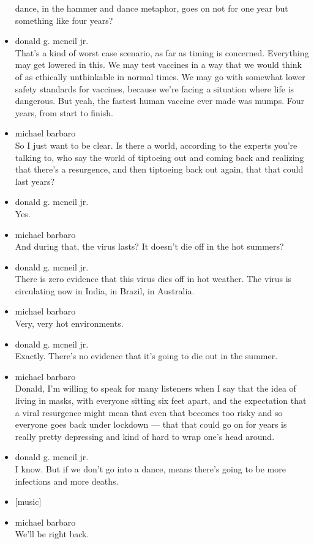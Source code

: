 \begin{itemize}
  dance, in the hammer and dance metaphor, goes on not for one year but
  something like four years?
\item
  donald g. mcneil jr.\\
  That's a kind of worst case scenario, as far as timing is concerned.
  Everything may get lowered in this. We may test vaccines in a way that
  we would think of as ethically unthinkable in normal times. We may go
  with somewhat lower safety standards for vaccines, because we're
  facing a situation where life is dangerous. But yeah, the fastest
  human vaccine ever made was mumps. Four years, from start to finish.
\item
  michael barbaro\\
  So I just want to be clear. Is there a world, according to the experts
  you're talking to, who say the world of tiptoeing out and coming back
  and realizing that there's a resurgence, and then tiptoeing back out
  again, that that could last years?
\item
  donald g. mcneil jr.\\
  Yes.
\item
  michael barbaro\\
  And during that, the virus lasts? It doesn't die off in the hot
  summers?
\item
  donald g. mcneil jr.\\
  There is zero evidence that this virus dies off in hot weather. The
  virus is circulating now in India, in Brazil, in Australia.
\item
  michael barbaro\\
  Very, very hot environments.
\item
  donald g. mcneil jr.\\
  Exactly. There's no evidence that it's going to die out in the summer.
\item
  michael barbaro\\
  Donald, I'm willing to speak for many listeners when I say that the
  idea of living in masks, with everyone sitting six feet apart, and the
  expectation that a viral resurgence might mean that even that becomes
  too risky and so everyone goes back under lockdown --- that that could
  go on for years is really pretty depressing and kind of hard to wrap
  one's head around.
\item
  donald g. mcneil jr.\\
  I know. But if we don't go into a dance, means there's going to be
  more infections and more deaths.
\item
  {[}music{]}
\item
  michael barbaro\\
  We'll be right back.


\end{itemize}
